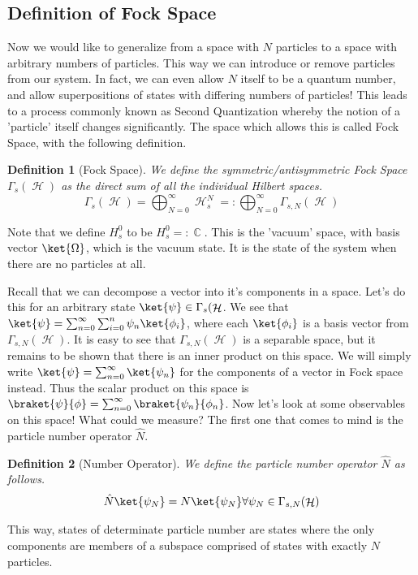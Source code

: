 \documentclass{article}
\DeclareMathOperator{\Hh}{{\mathcal{H}}}
\DeclareMathOperator{\CC}{\mathbb{C}}
\newtheorem{defn}{Definition}
\begin{document}
\subsection{Definition of Fock Space}
Now we would like to generalize from a space with $N$ particles to a space with arbitrary numbers of particles. This way we can introduce or remove particles from our system. In fact, we can even allow $N$ itself to be a quantum number, and allow superpositions of states with differing numbers of particles! This leads to a process commonly known as Second Quantization whereby the notion of a 'particle' itself changes significantly. The space which allows this is called Fock Space, with the following definition.

\begin{defn}[Fock Space] We define the symmetric/antisymmetric Fock Space $\Gamma_s(\Hh)$ as the direct sum of all the individual Hilbert spaces.
\begin{equation}
\Gamma_s(\Hh) = \bigoplus_{N=0}^\infty \Hh_s^N =: \bigoplus_{N=0}^\infty \Gamma_{s,N}(\Hh)
\end{equation}
\end{defn}
Note that we define $H_s^0$ to be $H_s^0=:\CC$. This is the 'vacuum' space, with basis vector $\ket{\Omega}$, which is the vacuum state. It is the state of the system when there are no particles at all.

Recall that we can decompose a vector into it's components in a space. Let's do this for an arbitrary state $\ket{\psi} \in \Gamma_s(\Hh$. We see that $\ket{\psi} = \sum_{n=0}^\infty\sum_{i=0}^n \psi_n \ket{\phi_i}$, where each $\ket{\phi_i}$ is a basis vector from $\Gamma_{s,N}(\Hh)$. It is easy to see that $\Gamma_{s,N}(\Hh)$ is a separable space, but it remains to be shown that there is an inner product on this space. We will simply write $\ket{\psi} = \sum_{n=0}^\infty \ket{\psi_n}$ for the components of a vector in Fock space instead. Thus the scalar product on this space is $\braket{\psi}{\phi}=\sum_{n=0}^\infty \braket{\psi_n}{\phi_n}$. Now let's look at some observables on this space! What could we measure? The first one that comes to mind is the particle number operator $\hat N$.
\begin{defn}[Number Operator]
We define the particle number operator $\hat N$ as follows.
\begin{equation}
\hat N \ket{\psi_N} = N\ket{\psi_N} \forall \psi_N \in \Gamma_{s,N}(\Hh)
\end{equation}
\end{defn}
This way, states of determinate particle number are states where the only components are members of a subspace comprised of states with exactly $N$ particles. 
\end{document}
